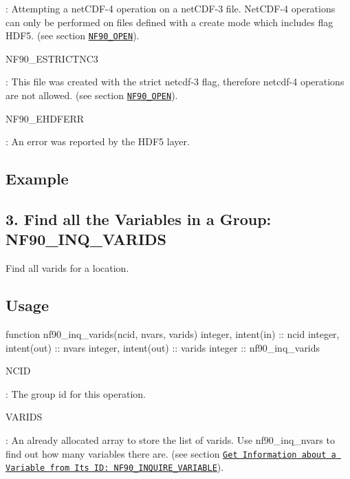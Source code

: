\+: Attempting a net\+C\+D\+F-\/4 operation on a net\+C\+D\+F-\/3 file. Net\+C\+D\+F-\/4 operations can only be performed on files defined with a create mode which includes flag H\+D\+F5. (see section \href{#NF90_005fOPEN}{\tt N\+F90\+\_\+\+O\+P\+EN}).

{\ttfamily N\+F90\+\_\+\+E\+S\+T\+R\+I\+C\+T\+N\+C3}

\+: This file was created with the strict netcdf-\/3 flag, therefore netcdf-\/4 operations are not allowed. (see section \href{#NF90_005fOPEN}{\tt N\+F90\+\_\+\+O\+P\+EN}).

{\ttfamily N\+F90\+\_\+\+E\+H\+D\+F\+E\+RR}

\+: An error was reported by the H\+D\+F5 layer.

\subsection*{Example}\hypertarget{f90_groups_f90-find-all-the-variables-in-a-group-nf90_inq_varids}{}\subsection{3. Find all the Variables in a Group\+: N\+F90\+\_\+\+I\+N\+Q\+\_\+\+V\+A\+R\+I\+D\+S }\label{f90_groups_f90-find-all-the-variables-in-a-group-nf90_inq_varids}
Find all varids for a location.

\subsection*{Usage}


\begin{DoxyCode}
\textcolor{keyword}{function }nf90\_inq\_varids(ncid, nvars, varids)
  \textcolor{keywordtype}{integer}, \textcolor{keywordtype}{intent(in)} :: ncid
  \textcolor{keywordtype}{integer}, \textcolor{keywordtype}{intent(out)} :: nvars
  \textcolor{keywordtype}{integer}, \textcolor{keywordtype}{intent(out)} :: varids
  \textcolor{keywordtype}{integer} :: nf90\_inq\_varids
\end{DoxyCode}


{\ttfamily N\+C\+ID}

\+: The group id for this operation.

{\ttfamily V\+A\+R\+I\+DS}

\+: An already allocated array to store the list of varids. Use nf90\+\_\+inq\+\_\+nvars to find out how many variables there are. (see section \href{#NF90_005fINQUIRE_005fVARIABLE}{\tt Get Information about a Variable from Its I\+D\+: N\+F90\+\_\+\+I\+N\+Q\+U\+I\+R\+E\+\_\+\+V\+A\+R\+I\+A\+B\+LE}).


